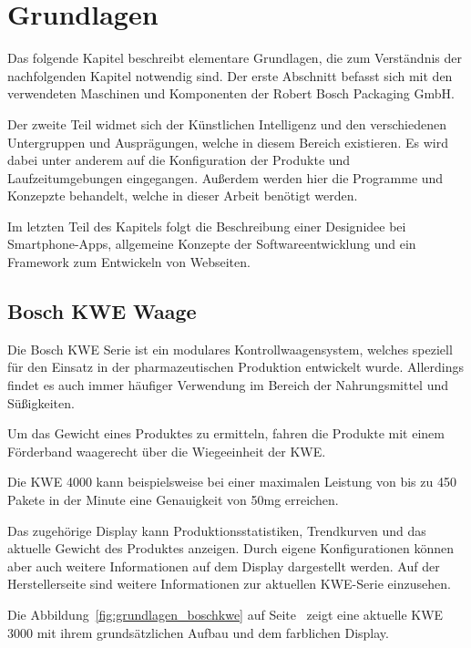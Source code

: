 \chapter{Grundlagen}
\label{ch:grundlagen}
Das folgende Kapitel beschreibt elementare Grundlagen, die zum Verständnis der nachfolgenden Kapitel notwendig sind. Der
erste Abschnitt befasst sich mit den verwendeten Maschinen und Komponenten der Robert Bosch Packaging GmbH.

Der zweite Teil widmet sich der Künstlichen Intelligenz und den verschiedenen Untergruppen und Ausprägungen, welche in
diesem Bereich existieren. Es wird dabei unter anderem auf die Konfiguration der Produkte und Laufzeitumgebungen
eingegangen. Außerdem werden hier die Programme und Konzepzte behandelt, welche in dieser Arbeit benötigt werden.

Im letzten Teil des Kapitels folgt die Beschreibung einer Designidee bei Smartphone-Apps, allgemeine Konzepte der
Softwareentwicklung und ein Framework zum Entwickeln von Webseiten.

\section{Bosch KWE Waage}
Die Bosch KWE Serie ist ein modulares Kontrollwaagensystem, welches speziell für den Einsatz in der pharmazeutischen
Produktion entwickelt wurde. Allerdings findet es auch immer häufiger Verwendung im Bereich der Nahrungsmittel und
Süßigkeiten.

Um das Gewicht eines Produktes zu ermitteln, fahren die Produkte mit einem Förderband waagerecht über die Wiegeeinheit
der KWE.

Die KWE 4000 kann beispielsweise bei einer maximalen Leistung von bis zu 450 Pakete in der Minute eine Genauigkeit von
50mg erreichen.

Das zugehörige Display kann Produktionsstatistiken, Trendkurven und das aktuelle Gewicht des Produktes anzeigen. Durch
eigene Konfigurationen können aber auch weitere Informationen auf dem Display dargestellt werden. Auf der
Herstellerseite\cite{online_grundlagen_boschkwe} sind weitere Informationen zur aktuellen KWE-Serie einzusehen.

Die Abbildung~\ref{fig:grundlagen_boschkwe} auf Seite~\pageref{fig:grundlagen_boschkwe} zeigt eine aktuelle KWE 3000 mit
ihrem grundsätzlichen Aufbau und dem farblichen Display.

